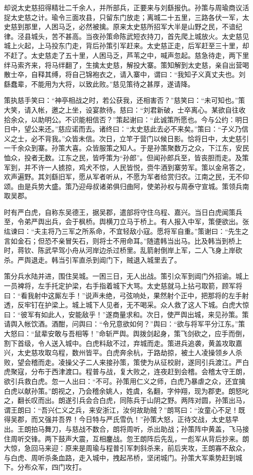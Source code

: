 却说太史慈招得精壮二千余人，并所部兵，正要来与刘繇报仇。孙策与周瑜商议活捉太史慈之计。瑜令三面攻县，只留东门放走；离城二十五里，三路各伏一军，太史慈到那里，人困马乏，必然被擒。原来太史慈所招军大半是山野之民，不谙纪律。泾县城头，苦不甚高。当夜孙策命陈武短衣持刀，首先爬上城放火。太史慈见城上火起，上马投东门走，背后孙策引军赶来。太史慈正走，后军赶至三十里，却不赶了。太史慈走了五十里，人困马乏，芦苇之中，喊声忽起。慈急待走，两下里绊马索齐来，将马绊翻了，生擒太史慈，解投大寨。策知解到太史慈，亲自出营喝散士卒，自释其缚，将自己锦袍衣之，请入寨中，谓曰：“我知子义真丈夫也。刘繇蠢辈，不能用为大将，以致此败。”慈见策待之甚厚，遂请降。

策执慈手笑曰：“神亭相战之时，若公获我，还相害否？”慈笑曰：“未可知也。”策大笑，请入帐，邀之上坐，设宴款待。慈曰：“刘君新破，士卒离心。某欲自往收拾余众，以助明公。不识能相信否？”策起谢曰：“此诚策所愿也。今与公约：明日日中，望公来还。”慈应诺而去。诸终曰：“太史慈此去必不来矣。”策曰：“子义乃信义之士，必不背我。”众皆未信。次日，立竿于营门以候日影。恰将日中，太史慈引一千余众到寨。孙策大喜。众皆服策之知人。于是孙策聚数万之众，下江东，安民恤众，投者无数。江东之民，皆呼策为“孙郎”。但闻孙郎兵至，皆丧胆而走。及策军到，并不许一人掳掠，鸡犬不惊，人民皆悦，赍牛酒到寨劳军。策以金帛答之，欢声遍野。其刘繇旧军，愿从军者听从，不愿为军者给赏归农。江南之民，无不仰颂。由是兵势大盛。策乃迎母叔诸弟俱归曲阿，使弟孙权与周泰守宣城。策领兵南取吴郡。

时有严白虎，自称东吴德王，据吴郡，遣部将守住乌程、嘉兴。当日白虎闻策兵至，令弟严舆出兵，会于枫桥。舆横刀立马于桥上。有人报入中军，策便欲出。张纮谏曰：“夫主将乃三军之所系命，不宜轻敌小寇。愿将军自重。”策谢曰：“先生之言如金石；但恐不亲冒矢石，则将士不用命耳。”随遣韩当出马。比及韩当到桥上时，蒋钦、陈武早驾小舟从河岸边杀过桥里。乱箭射倒岸上军，二人飞身上岸砍杀。严舆退走。韩当引军直杀到阊门下，贼退入城里去了。

策分兵水陆并进，围住吴城。一困三日，无人出战。策引众军到阊门外招谕。城上一员裨将，左手托定护梁，右手指着城下大骂。太史慈就马上拈弓取箭，顾军将曰：“看我射中这厮左手！”说声未绝，弓弦响处，果然射个正中，把那将的左手射透，反牢钉在护梁上。城上城下人见者，无不喝采。众人救了这人下城。白虎大惊曰：“彼军有如此人，安能敌乎！”遂商量求和。次日，使严舆出城，来见孙策。策请舆入帐饮酒。酒酣，问舆曰：“令兄意欲如何？”舆曰：“欲与将军平分江东。”策大怒曰：“鼠辈安敢与吾相等！”命斩严舆。舆拨剑起身，策飞剑砍之，应手而倒，割下首级，令人送入城中。白虎料敌不过，弃城而走。策进兵追袭，黄盖攻取嘉兴，太史慈攻取乌程，数州皆平。白虎奔余杭，于路劫掠，被土人凌操领乡人杀败，望会稽而走。凌操父子二人来接孙策，策使为从征校尉，遂同引兵渡江。严白虎聚寇，分布于西津渡口。程普与战，复大败之，连夜赶到会稽。会稽太守王朗，欲引兵救白虎。忽一人出曰：“不可。孙策用仁义之师，白虎乃暴虐之众，还宜擒白虎以献孙策。”朗视之，乃会稽余姚人，姓虞，名翻，字仲翔，现为郡吏。朗怒叱之，翻长叹而出。朗遂引兵会合白虎，同陈兵于山阴之野。两阵对圆，孙策出马，谓王朗曰：“吾兴仁义之兵，来安浙江，汝何故助贼？”朗骂曰：“汝童心不足！既得吴郡，而又强并吾界！今日特与严氏雪仇！”孙策大怒，正待交战，太史慈早出。王朗拍马舞刀，与慈战不数合，朗将周听，杀出助战；孙策阵中黄盖，飞马接住周听交锋。两下鼓声大震，互相鏖战。忽王朗阵后先乱，一彪军从背后抄来。朗大惊，急回马来迎：原来是周瑜与程普引军刺斜杀来，前后夹攻，王朗寡不敌众，与白虎、周听杀条血路，走入城中，拽起吊桥，坚闭城门。孙策大军乘势赶到城下。分布众军，四门攻打。

